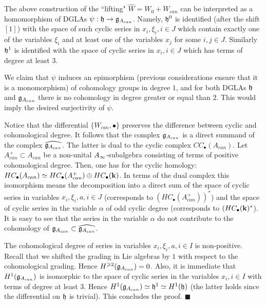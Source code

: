 \documentclass[12pt]{article}
\begin{document}
The above construction of the ``lifting" $\widehat{W}=W_0+W_{can}$ can be interpreted as a homomorphism of DGLAs $\psi:{{\mathfrak h}}\to {\mathfrak g}_{A_{can}}$. Namely, ${{\mathfrak h}}^0$ is identified (after the shift $[1]$) with the space of such cyclic series in $x_i,\xi_i, i\in J$ which contain exactly one of the variables $\xi_i$ and at least one of the variables $x_j$ for some $i,j\in J$. Similarly ${{\mathfrak h}}^1$ is identified with the space of cyclic series in $x_i,i\in J$ which has terms of degree at least $3$.

We claim that $\psi$ induces an epimorphism (previous considerations ensure that it is a monomorphism) of cohomology groups in degree $1$, and for both DGLAs ${{\mathfrak h}}$ and  ${\mathfrak g}_{A_{can}}$ there is no cohomology in degree greater or equal than $2$. This would imply the desired surjectivity of $\psi$.

Notice that the differential $\{W_{can},\bullet\}$ preserves the difference between cyclic and cohomological degree. It follows that  the complex ${\mathfrak g}_{A_{can}}$ is a direct summand of the complex $\widehat{{\mathfrak g}_{A_{can}}}$. The latter is dual to the cyclic complex $CC_{\bullet}(A_{can})$. Let $A_{can}^+\subset A_{can}$ be a non-unital $A_{\infty}$-subalgebra consisting of terms of positive cohomological degree. Then, one has for the cyclic homology: $HC_{\bullet}(A_{can})\simeq HC_{\bullet}(A_{can}^+)\oplus HC_{\bullet}({\bf k})$. In terms of the dual complex this isomorphism means the decomposition into a direct sum of the space of cyclic series in variables $x_i,\xi_i,a, i\in J$ (corresponds to $(HC_{\bullet}(A_{can}^+))^{\ast}$) and the space of cyclic series in the variable $\alpha$ of odd cyclic degree (corresponds to $(HC_{\bullet}({\bf k})^{\ast}$). It is easy to see that the series in the variable $\alpha$ do not contribute to the cohomology of ${\mathfrak g}_{A_{can}}\subset\widehat{{\mathfrak g}_{A_{can}}} $.

The cohomological degree of series in variables $x_i,\xi_i,a, i\in I$ is non-positive. Recall that we shifted the grading in Lie algebras by $1$ with respect to the cohomological grading.  Hence $H^{\geqslant 2}({\mathfrak g}_{A_{can}})=0$. Also, it is immediate that $H^1({\mathfrak g}_{A_{can}})$ is isomorphic to the space of cyclic series in the variables $x_i,i\in I$  with terms of degree at least $3$. Hence $H^1({\mathfrak g}_{A_{can}})\simeq {{\mathfrak h}}^1\simeq H^1({{\mathfrak h}})$ (the latter holds since the differential on ${{\mathfrak h}}$ is trivial). This concludes  the proof. $\blacksquare$
\end{document}
